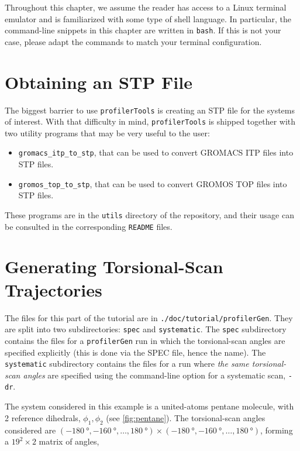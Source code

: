 \documentclass[10pt,a4paper,openany]{memoir}
\numberwithin{equation}{section}
\newcommand{\profilergen}[0]{\texttt{profilerGen}}
\newcommand{\profilertools}[0]{\texttt{profilerTools}}
\begin{document}
Throughout this chapter, we assume the reader has access to a Linux
terminal emulator and is familiarized with some type of shell
language.
%
In particular, the command-line snippets in this chapter are written
in \texttt{bash}.
%
If this is not your case, please adapt the commands to match your
terminal configuration.

\section{Obtaining an STP File}
\label{sec:tutorial-utils}

The biggest barrier to use \profilertools{} is creating an STP file
for the systems of interest.  With that difficulty in mind,
\profilertools{} is shipped together with two utility programs that
may be very useful to the user:
\begin{itemize}
\item \texttt{gromacs\_itp\_to\_stp}, that can be used to convert GROMACS
  ITP files into STP files.
\item \texttt{gromos\_top\_to\_stp}, that can be used to convert GROMOS
  TOP files into STP files.
\end{itemize}
These programs are in the \texttt{utils} directory of the repository,
and their usage can be consulted in the corresponding \texttt{README}
files.

\section{Generating Torsional-Scan Trajectories}
\label{sec:tutorial-profilergen}

The files for this part of the tutorial are in
\texttt{./doc/tutorial/profilerGen}. They are split into two subdirectories:
\texttt{spec} and \texttt{systematic}.  The \texttt{spec} subdirectory contains
the files for a \profilergen{} run in which the torsional-scan angles are
specified explicitly (this is done via the SPEC file, hence the name).  The
\texttt{systematic} subdirectory contains the files for a run where \textit{the
  same torsional-scan angles} are specified using the command-line option for a
systematic scan, \texttt{-dr}.

The system considered in this example is a united-atoms pentane
molecule, with 2 reference dihedrals, $\phi_1,\phi_2$ (see
\autoref{fig:pentane}). The torsional-scan angles considered are
$(\SI{-180}{\degree},\SI{-160}{\degree},\ldots,\SI{180}{\degree})
\times
(\SI{-180}{\degree},\SI{-160}{\degree},\ldots,\SI{180}{\degree})$,
forming a $19^2 \times 2$ matrix of angles,
\end{document}
